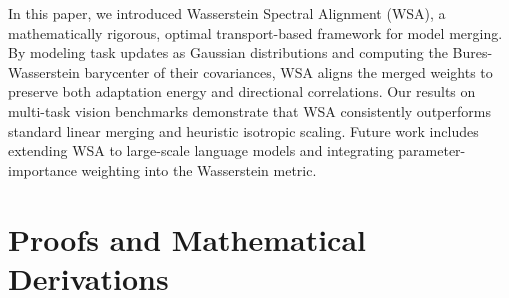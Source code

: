 \documentclass{article}
\theoremstyle{plain}
\theoremstyle{definition}
\theoremstyle{remark}
\begin{document}
In this paper, we introduced Wasserstein Spectral Alignment (WSA), a mathematically rigorous, optimal transport-based framework for model merging. By modeling task updates as Gaussian distributions and computing the Bures-Wasserstein barycenter of their covariances, WSA aligns the merged weights to preserve both adaptation energy and directional correlations. Our results on multi-task vision benchmarks demonstrate that WSA consistently outperforms standard linear merging and heuristic isotropic scaling. Future work includes extending WSA to large-scale language models and integrating parameter-importance weighting into the Wasserstein metric.




\newpage
\appendix
\onecolumn
\section{Proofs and Mathematical Derivations}
\end{document}
